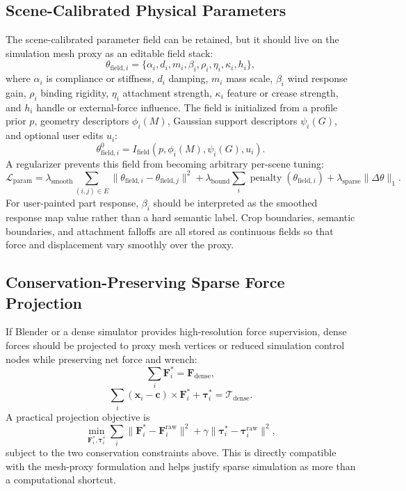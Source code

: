 \documentclass[11pt]{article}
\begin{document}
\subsection{Scene-Calibrated Physical Parameters}

The scene-calibrated parameter field can be retained, but it should live on the simulation mesh proxy as an editable field stack:
\[
  \theta_{\mathrm{field},i}
  =
  \{\alpha_i,d_i,m_i,\beta_i,\rho_i,\eta_i,\kappa_i,h_i\},
\]
where \(\alpha_i\) is compliance or stiffness, \(d_i\) damping, \(m_i\) mass scale, \(\beta_i\) wind response gain, \(\rho_i\) binding rigidity, \(\eta_i\) attachment strength, \(\kappa_i\) feature or crease strength, and \(h_i\) handle or external-force influence. The field is initialized from a profile prior \(p\), geometry descriptors \(\phi_i(M)\), Gaussian support descriptors \(\psi_i(G)\), and optional user edits \(u_i\):
\[
  \theta_{\mathrm{field},i}^{0}
  =
  I_{\mathrm{field}}\left(p,\phi_i(M),\psi_i(G),u_i\right).
\]
A regularizer prevents this field from becoming arbitrary per-scene tuning:
\[
  \mathcal{L}_{\mathrm{param}}
  =
  \lambda_{\mathrm{smooth}}
  \sum_{(i,j)\in E}
  \|\theta_{\mathrm{field},i}-\theta_{\mathrm{field},j}\|^2
  +
  \lambda_{\mathrm{bound}}
  \sum_i \operatorname{penalty}(\theta_{\mathrm{field},i})
  +
  \lambda_{\mathrm{sparse}}
  \|\Delta\theta\|_1.
\]
For user-painted part response, \(\beta_i\) should be interpreted as the smoothed response map value rather than a hard semantic label. Crop boundaries, semantic boundaries, and attachment falloffs are all stored as continuous fields so that force and displacement vary smoothly over the proxy.

\subsection{Conservation-Preserving Sparse Force Projection}

If Blender or a dense simulator provides high-resolution force supervision, dense forces should be projected to proxy mesh vertices or reduced simulation control nodes while preserving net force and wrench:
\[
  \sum_i \mathbf{F}_i^\ast = \mathbf{F}_{\mathrm{dense}},
\]
\[
  \sum_i
  (\mathbf{x}_i-\mathbf{c})\times \mathbf{F}_i^\ast
  +
  \boldsymbol{\tau}_i^\ast
  =
  \boldsymbol{\mathcal{T}}_{\mathrm{dense}}.
\]
A practical projection objective is
\[
  \min_{\mathbf{F}_i^\ast,\boldsymbol{\tau}_i^\ast}
  \sum_i
  \|\mathbf{F}_i^\ast-\mathbf{F}_i^{\mathrm{raw}}\|^2
  +
  \gamma
  \|\boldsymbol{\tau}_i^\ast-\boldsymbol{\tau}_i^{\mathrm{raw}}\|^2,
\]
subject to the two conservation constraints above. This is directly compatible with the mesh-proxy formulation and helps justify sparse simulation as more than a computational shortcut.
\end{document}
